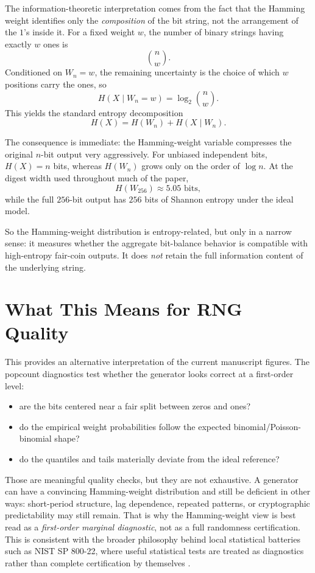 \documentclass[11pt]{article}
\begin{document}
The information-theoretic interpretation comes from the fact that the Hamming
weight identifies only the \emph{composition} of the bit string, not the
arrangement of the $1$'s inside it. For a fixed weight $w$, the number of
binary strings having exactly $w$ ones is
\[
\binom{n}{w}.
\]
Conditioned on $W_n = w$, the remaining uncertainty is the choice of which $w$
positions carry the ones, so
\[
H(X \mid W_n = w) = \log_2 \binom{n}{w}.
\]
This yields the standard entropy decomposition
\[
H(X) = H(W_n) + H(X \mid W_n).
\]

The consequence is immediate: the Hamming-weight variable compresses the
original $n$-bit output very aggressively. For unbiased independent bits,
$H(X)=n$ bits, whereas $H(W_n)$ grows only on the order of $\log n$. At the
digest width used throughout much of the paper,
\[
H(W_{256}) \approx 5.05 \text{ bits},
\]
while the full $256$-bit output has $256$ bits of Shannon entropy under the
ideal model.

So the Hamming-weight distribution is entropy-related, but only in a narrow
sense: it measures whether the aggregate bit-balance behavior is compatible
with high-entropy fair-coin outputs. It does \emph{not} retain the full
information content of the underlying string.

\section{What This Means for RNG Quality}

This provides an alternative interpretation of the current manuscript figures.
The popcount diagnostics test whether the generator looks correct at a
first-order level:
\begin{itemize}
\item are the bits centered near a fair split between zeros and ones?
\item do the empirical weight probabilities follow the expected
binomial/Poisson-binomial shape?
\item do the quantiles and tails materially deviate from the ideal reference?
\end{itemize}

Those are meaningful quality checks, but they are not exhaustive. A generator
can have a convincing Hamming-weight distribution and still be deficient in
other ways: short-period structure, lag dependence, repeated patterns, or
cryptographic predictability may still remain. That is why the Hamming-weight
view is best read as a \emph{first-order marginal diagnostic}, not as a full
randomness certification. This is consistent with the broader philosophy behind
local statistical batteries such as NIST SP 800-22, where useful statistical
tests are treated as diagnostics rather than complete certification by
themselves \citep{NISTSP80022}.
\end{document}
